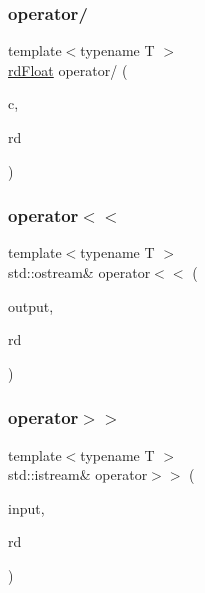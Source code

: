 \mbox{\label{structrd_float_a8dadbd9168037a78a3c0cd7e96f0073f}} 
\subsubsection{\texorpdfstring{operator/}{operator/}}
{\footnotesize\ttfamily template$<$typename T $>$ \\
\mbox{\hyperlink{structrd_float}{rd\+Float}} operator/ (\begin{DoxyParamCaption}\item[{T}]{c,  }\item[{const \mbox{\hyperlink{structrd_float}{rd\+Float}}$<$ T $>$ \&}]{rd }\end{DoxyParamCaption})\hspace{0.3cm}{\ttfamily [friend]}}

\mbox{\label{structrd_float_a56722904366eb9b6860e7151162213c9}} 
\subsubsection{\texorpdfstring{operator$<$$<$}{operator<<}}
{\footnotesize\ttfamily template$<$typename T $>$ \\
std\+::ostream\& operator$<$$<$ (\begin{DoxyParamCaption}\item[{std\+::ostream \&}]{output,  }\item[{const \mbox{\hyperlink{structrd_float}{rd\+Float}}$<$ T $>$ \&}]{rd }\end{DoxyParamCaption})\hspace{0.3cm}{\ttfamily [friend]}}

\mbox{\label{structrd_float_a5b99d2ff3f3d58999dd86a5afdd8a843}} 
\subsubsection{\texorpdfstring{operator$>$$>$}{operator>>}}
{\footnotesize\ttfamily template$<$typename T $>$ \\
std\+::istream\& operator$>$$>$ (\begin{DoxyParamCaption}\item[{std\+::istream \&}]{input,  }\item[{\mbox{\hyperlink{structrd_float}{rd\+Float}}$<$ T $>$ \&}]{rd }\end{DoxyParamCaption})\hspace{0.3cm}{\ttfamily [friend]}}




